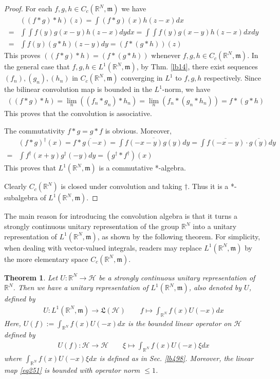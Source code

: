 \documentclass[12pt,b5paper,notitlepage]{article}
\theoremstyle{definition}
\theoremstyle{plain}
\newtheorem{thm}[df]{Theorem}
\newcommand{\fk}{\mathfrak}
\newcommand{\ovl}{\overline}
\newcommand{\Rbb}{\mathbb R}
\newcommand{\mk}{\mathfrak m}
\newcommand{\MH}{\mathcal H}
\numberwithin{equation}{section}
\begin{document}
\begin{proof}
For each $f,g,h\in C_c(\Rbb^N,\mk)$ we have
\begin{align*}
&((f*g)*h)(z)=\int (f*g)(x)h(z-x)dx \\
=&\int\int f(y)g(x-y)h(z-x)dydx=\int\int f(y)g(x-y)h(z-x)dxdy\\
=&\int f(y)(g*h)(z-y)dy=(f*(g*h))(z)
\end{align*}
This proves $((f*g)*h)=(f*(g*h))$ whenever $f,g,h\in C_c(\Rbb^N,\mk)$. In the general case that $f,g,h\in L^1(\Rbb^N,\mk)$, by Thm. \ref{lb14}, there exist sequences $(f_n),(g_n),(h_n)$ in $C_c(\Rbb^N,\mk)$ converging in $L^1$ to $f,g,h$ respectively. Since the bilinear convolution map is bounded in the $L^1$-norm, we have
\begin{align*}
((f*g)*h)=\lim_n ((f_n*g_n)*h_n)=\lim_n (f_n*(g_n*h_n))=f*(g*h)
\end{align*}
This proves that the convolution is associative. 

The commutativity $f*g=g*f$ is obvious. Moreover,
\begin{align*}
&(f*g)^\dagger(x)=\ovl{f*g(-x)}=\ovl{\int f(-x-y)g(y)dy}=\int\ovl{f(-x-y)}\cdot\ovl{g(y)}dy\\
=&\int f^\dagger (x+y)g^\dagger(-y)dy=(g^\dagger*f^\dagger)(x)
\end{align*}
This proves that $L^1(\Rbb^N,\mk)$ is a commutative *-algebra. 

Clearly $C_c(\Rbb^N)$ is closed under convolution and taking $\dagger$. Thus it is a *-subalgebra of $L^1(\Rbb^N,\mk)$.
\end{proof}

The main reason for introducing the convolution algebra is that it turns a strongly continuous unitary representation of the group $\Rbb^N$ into a unitary representation of $L^1(\Rbb^N,\mk)$, as shown by the following theorem. For simplicity, when dealing with vector-valued integrals, readers may replace $L^1(\Rbb^N,\mk)$ by the more elementary space $C_c(\Rbb^N,\mk)$.

\begin{thm}\label{lb530}
Let $U:\Rbb^N\rightarrow\MH$ be a strongly continuous unitary representation of $\Rbb^N$. Then we have a unitary representation of $L^1(\Rbb^N,\mk)$, also denoted by $U$, defined by
\begin{gather}\label{eq251}
U:L^1(\Rbb^N,\mk)\rightarrow\fk L(\MH)\qquad f\mapsto \int_{\Rbb^N}f(x)U(-x)dx
\end{gather}
Here, $U(f):=\int_{\Rbb^N}f(x)U(-x)dx$ is the bounded linear operator on $\MH$ defined by
\begin{align*}
U(f):\MH\rightarrow\MH\qquad \xi\mapsto\int_{\Rbb^N}f(x)U(-x)\xi dx
\end{align*}
where $\int_{\Rbb^N}f(x)U(-x)\xi dx$ is defined as in Sec. \ref{lb498}. Moreover, the linear map \eqref{eq251} is bounded with operator norm $\leq 1$.
\end{thm}
\end{document}
